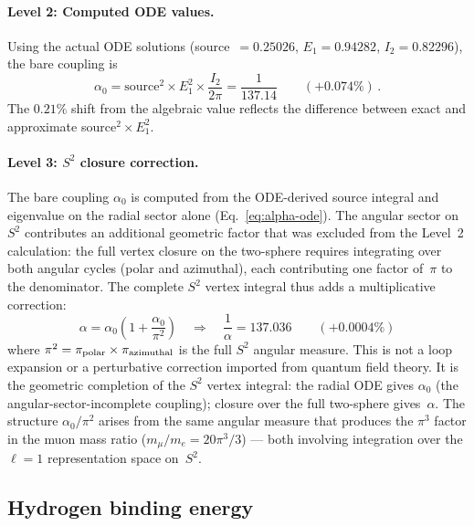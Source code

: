 \documentclass[aps,prd,twocolumn,superscriptaddress,nofootinbib,longbibliography]{revtex4-2}
\begin{document}
\paragraph{Level 2: Computed ODE values.}  Using the actual ODE
solutions (source~$= 0.25026$, $E_1 = 0.94282$, $I_2 = 0.82296$),
the bare coupling is
\begin{equation}\label{eq:alpha-ode}
  \alpha_0 = \mathrm{source}^2 \times E_1^2
    \times \frac{I_2}{2\pi} = \frac{1}{137.14}
  \qquad(+0.074\%)\,.
\end{equation}
The $0.21\%$ shift from the algebraic value reflects the difference
between exact and approximate source$^2 \times E_1^2$.

\paragraph{Level 3: $S^2$ closure correction.}  The bare coupling
$\alpha_0$ is computed from the ODE-derived source integral and
eigenvalue on the radial sector alone (Eq.~\ref{eq:alpha-ode}).  The
angular sector on~$S^2$ contributes an additional geometric factor
that was excluded from the Level~2 calculation: the full vertex
closure on the two-sphere requires integrating over both angular
cycles (polar and azimuthal), each contributing one factor of~$\pi$ to
the denominator.  The complete $S^2$ vertex integral thus adds a
multiplicative correction:
\begin{equation}\label{eq:alpha-corr}
  \boxed{\alpha = \alpha_0\!\left(1 + \frac{\alpha_0}{\pi^2}\right)
  \quad\Longrightarrow\quad
  \frac{1}{\alpha} = 137.036
  \qquad(+0.0004\%)}
\end{equation}
where $\pi^2 = \pi_{\rm polar} \times \pi_{\rm azimuthal}$ is the
full $S^2$ angular measure.  This is not a loop expansion or a
perturbative correction imported from quantum field theory.  It is the
geometric completion of the $S^2$ vertex integral: the radial ODE
gives $\alpha_0$ (the angular-sector-incomplete coupling); closure
over the full two-sphere gives~$\alpha$.  The structure $\alpha_0/\pi^2$
arises from the same angular measure that produces the $\pi^3$ factor
in the muon mass ratio ($m_\mu/m_e = 20\pi^3/3$) --- both involving
integration over the $\ell = 1$ representation space on~$S^2$.

\subsection{Hydrogen binding energy}
\end{document}
